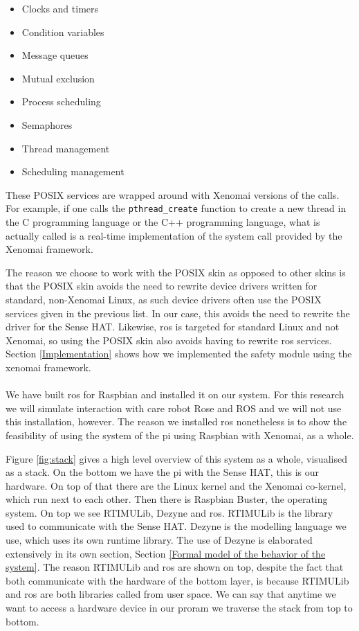 \documentclass[12pt]{scrreprt}
\begin{document}
\begin{itemize}\label{posix_wrapped}
    \item Clocks and timers
    \item Condition variables
    \item Message queues
    \item Mutual exclusion 
    \item Process scheduling 
    \item Semaphores
    \item Thread management
    \item Scheduling management
\end{itemize}

These POSIX services are wrapped around with Xenomai versions of the calls. For example, if one calls the \texttt{pthread_create} function to create a new thread in the C programming language or the C++ programming language, what is actually called is a real-time implementation of the system call provided by the Xenomai framework.
\par
The reason we choose to work with the POSIX skin as opposed to other skins is that the POSIX skin avoids the need to rewrite device drivers written for standard, non-Xenomai Linux, as such device drivers often use the POSIX services given in the previous list. In our case, this avoids the need to rewrite the driver for the Sense HAT. Likewise, \acrshort{ros} is targeted for standard Linux and not Xenomai, so using the POSIX skin also avoids having to rewrite \acrshort{ros} services. Section \ref{Implementation} shows how we implemented the safety module using the xenomai framework.
\\\\
We have built \acrshort{ros} for Raspbian and installed it on our system. For this research we will simulate interaction with care robot Rose and ROS and we will not use this installation, however. The reason we installed \acrshort{ros} nonetheless is to show the feasibility of using the system of the \gls{pi} using Raspbian with Xenomai, as a whole.
\par
Figure \ref{fig:stack} gives a high level overview of this system as a whole, visualised as a stack. On the bottom we have the \gls{pi} with the Sense HAT, this is our hardware. On top of that there are the Linux kernel and the Xenomai co-kernel, which run next to each other. Then there is Raspbian Buster, the operating system. On top we see RTIMULib, Dezyne and \acrshort{ros}. RTIMULib is the library used to communicate with the Sense HAT. Dezyne is the modelling language we use, which uses its own runtime library. The use of Dezyne is elaborated extensively in its own section, Section \ref{Formal model of the behavior of the system}. The reason RTIMULib and \acrshort{ros} are shown on top, despite the fact that both communicate with the hardware of the bottom layer, is because RTIMULib and \acrshort{ros} are both libraries called from user space. We can say that anytime we want to access a hardware device in our proram we traverse the stack from top to bottom.
\end{document}
